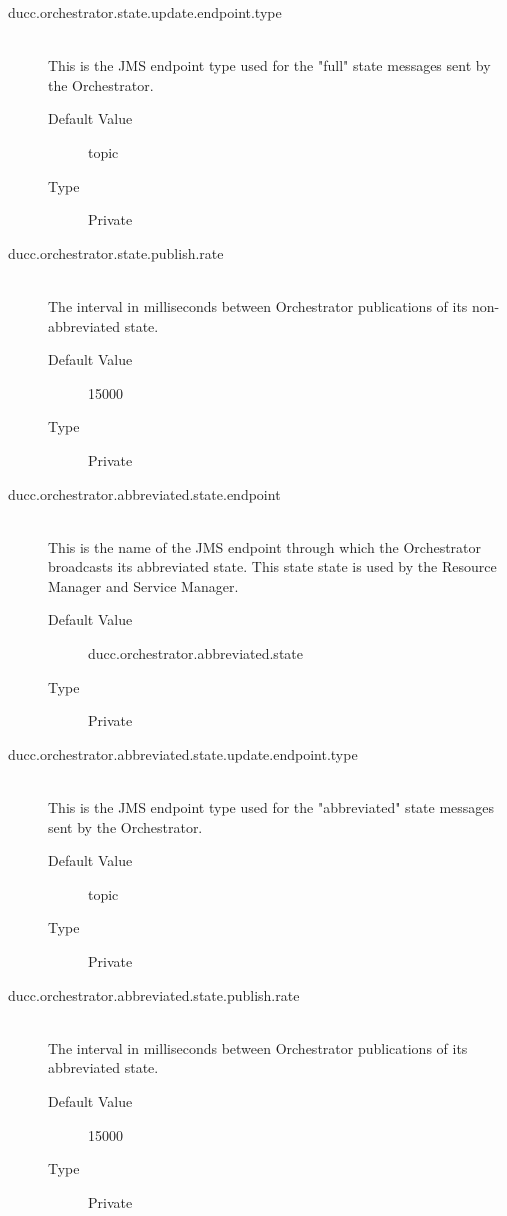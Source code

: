 \begin{description}
      \item[ducc.orchestrator.state.update.endpoint.type] \hfill \\
        This is the JMS endpoint type used for the "full" state messages sent by the Orchestrator. 
        \begin{description}
          \item[Default Value] topic 
          \item[Type] Private
        \end{description} 
        
      \item[ducc.orchestrator.state.publish.rate] \hfill \\
        The interval in milliseconds between Orchestrator publications of its non-abbreviated  
        state. 
        \begin{description}
          \item[Default Value] 15000 
          \item[Type] Private 
        \end{description}
        
      \item[ducc.orchestrator.abbreviated.state.endpoint] \hfill \\
        This is the name of the JMS endpoint through which the Orchestrator broadcasts its 
        abbreviated state. This state state is used by the Resource Manager and Service Manager. 
        \begin{description}
          \item[Default Value] ducc.orchestrator.abbreviated.state 
          \item[Type] Private
        \end{description} 
        
      \item[ducc.orchestrator.abbreviated.state.update.endpoint.type] \hfill \\
        This is the JMS endpoint type used for the "abbreviated" state messages sent by the 
        Orchestrator. 
        \begin{description}
          \item[Default Value] topic 
          \item[Type] Private
        \end{description} 
        
      \item[ducc.orchestrator.abbreviated.state.publish.rate] \hfill \\
        The interval in milliseconds between Orchestrator publications of its abbreviated state. 
        \begin{description}
          \item[Default Value] 15000 
          \item[Type] Private
        \end{description} 


\end{description}
